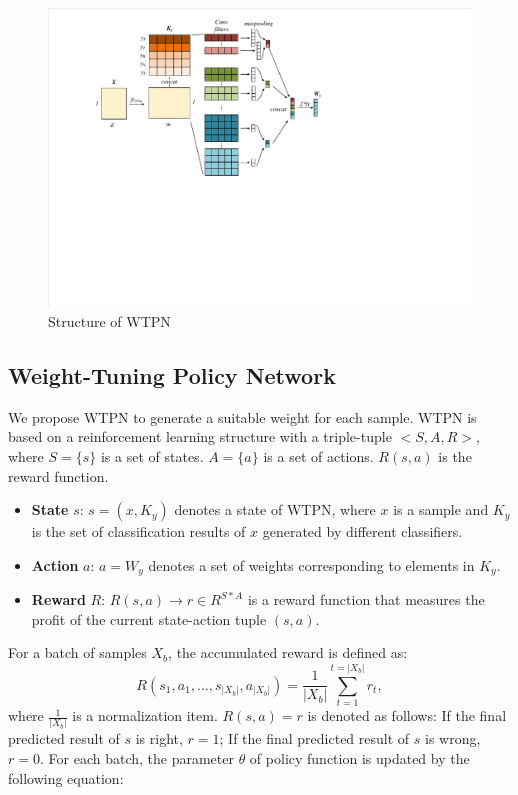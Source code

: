 \begin{figure}[tbp]
	\hspace{0ex}
	\vspace{0ex}
	\centering
	\includegraphics[width = \textwidth]{fig/WTPN}
	\caption{Structure of WTPN}
	\label{fig:WTPN}
\end{figure}

\subsection{Weight-Tuning Policy Network}
We propose WTPN to generate a suitable weight for each sample. WTPN is based on a reinforcement learning structure with a triple-tuple $<S, A, R>$, where $S = \{ s \}$ is a set of states. $A = \{ a \}$ is a set of actions. $R(s, a)$ is the reward function.
\begin{itemize}
	\item \textbf{State} $s$: $s = ( x, K_y )$ denotes a state of WTPN, where $x$ is a sample and $K_y$ is the set of classification results of $x$ generated by different classifiers.
	
	\item \textbf{Action} $a$: $a = W_y$ denotes a set of weights corresponding to elements in $K_y$.
	
	\item \textbf{Reward} $R$: $R(s, a) \to r \in R^{S * A}$ is a reward function that measures the profit of the current state-action tuple $(s, a)$.
\end{itemize}

For a batch of samples $X_b$, the accumulated reward is defined as:
\begin{equation}
R(s_1, a_1, ..., s_{|X_b|},a_{|X_b|}) = \frac{1}{|X_b|}\sum_{t = 1}^{t = |X_b|} r_t,
\end{equation}
where $ \frac{1}{|X_b|}$ is a normalization item. $R(s,a) = r$ is denoted as follows: If the final predicted result of $s$ is right, $r = 1$; If the final predicted result of $s$ is wrong, $r = 0$.
For each batch, the parameter $\theta$ of policy function is updated by the following equation: 

